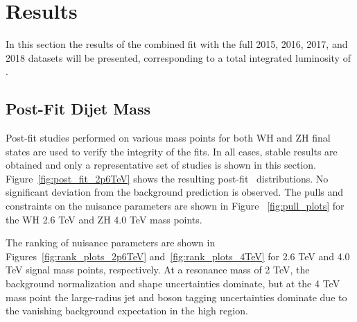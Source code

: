 \graphicspath{{Ch6_Results/figures/}}

\chapter{Results}
\label{ch:results}
In this section the results of the combined fit with the full 2015, 2016, 2017, and 2018 datasets will be presented, corresponding to a total integrated luminosity of \lumi.

\section{Post-Fit Dijet Mass}

Post-fit studies performed on various mass points for both WH and ZH final states are used to verify the integrity of the fits.
In all cases, stable results are obtained and only a representative set of studies is shown in this section.
Figure~\ref{fig:post_fit_2p6TeV} shows the resulting post-fit \mvh\ distributions.
No significant deviation from the background prediction is observed.
The pulls and constraints on the nuisance parameters are shown in Figure ~\ref{fig:pull_plots} for the WH 2.6 TeV and ZH 4.0 TeV mass points.

The ranking of nuisance parameters are shown in Figures~\ref{fig:rank_plots_2p6TeV} and~\ref{fig:rank_plots_4TeV} for 2.6 TeV and 4.0 TeV signal mass points, respectively.
At a resonance mass of 2 TeV, the background normalization and shape uncertainties dominate, but at the 4 TeV mass point the large-radius jet and boson tagging uncertainties dominate due to the vanishing background expectation in the high \mjj region.

